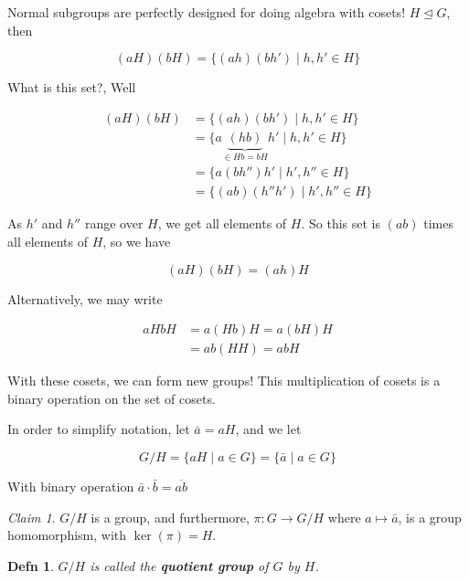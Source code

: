 \documentclass[12pt]{article}
\newtheorem{definition}{Defn}
\theoremstyle{remark}
\theoremstyle{remark}
\newtheorem{claim}{Claim}
\theoremstyle{remark}
\theoremstyle{remark}
\theoremstyle{remark}
\begin{document}
Normal subgroups are perfectly designed for doing algebra with cosets! $H
\trianglelefteq G$, then

\[
  (aH)(bH) = \{(ah)(bh') \mid h, h' \in H \}
\]

What is this set?, Well

\begin{align*}
  (aH)(bH) &= \{(ah)(bh') \mid h, h' \in H \} \\
           &= \{a \underbrace{(hb)}_{\in Hb = bH} h' \mid h, h' \in H \} \\
           &= \{a (b h'') h' \mid h', h'' \in H \} \\
           &= \{(ab)(h'' h') \mid h', h'' \in H \}
\end{align*}

As $h'$ and $h''$ range over $H$, we get all elements of $H$. So this set is
$(ab)$ times all elements of $H$, so we have

\[
  (aH)(bH) = (ah) H
\]

Alternatively, we may write

\begin{align*}
  aH bH &= a(Hb)H = a(bH)H \\
        &= ab (HH) = abH
\end{align*}

With these cosets, we can form new groups! This multiplication of cosets is a
binary operation on the set of cosets.

In order to simplify notation, let $\bar a = a H$, and we let

\[
  G / H = \{aH \mid a \in G\} = \{\bar a \mid a \in G \}
\]

With binary operation $\bar a \cdot \bar b = \overline{ab}$

\begin{claim}
  $G / H$ is a group, and furthermore, $\pi: G \to G / H$ where $a \mapsto \bar
  a$, is a group homomorphism, with $\ker(\pi) = H$.
\end{claim}

\begin{definition}
  $G / H$ is called the {\bf quotient group} of $G$ by $H$.
\end{definition}
\end{document}
